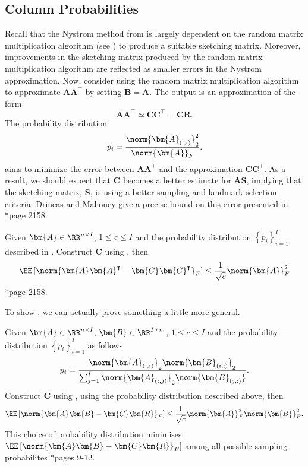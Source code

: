 \subsection{Column Probabilities}\label{Section2.2}

Recall that the Nystrom method from  is largely dependent on the random matrix multiplication algorithm (see ) to produce a suitable sketching matrix. Moreover, improvements in the sketching matrix produced by the random matrix multiplication algorithm are reflected as smaller errors in the Nystrom approximation. Now, consider using the random matrix multiplication algorithm to approximate $\bm{A} \bm{A}^{\intercal}$ by setting $\bm{B} = \bm{A}$. The output is an approximation of the form
\begin{equation*}
    \bm{A} \bm{A}^{\intercal} \simeq \bm{C} \bm{C}^{\intercal} = \bm{C} \bm{R}.
\end{equation*}
The probability distribution
\begin{equation*} \label{eq: col-probs}
    p_i = \frac{\norm{\bm{A}_{(:,i)}}_2^2}{\norm{\bm{A}}_F}.
\end{equation*}
aims to minimize the error between $\bm{A} \bm{A}^{\intercal}$ and the approximation $\bm{C} \bm{C}^{\intercal}$. As a result, we should expect that $\bm{C}$ becomes a better estimate for $\bm{A} \bm{S}$, implying that the sketching matrix, $\bm{S}$, is using a better sampling and landmark selection criteria. Drineas and Mahoney give a precise bound on this error presented in  \cite{JMLR:v6:drineas05a}*{page 2158}.

\begin{thm} \label{thm: col-pro-bounds}
    Given $\bm{A} \in \RR^{n \times I}$, $1 \leq c \leq I$ and the probability distribution $\left\{ p_i \right\}_{i=1}^{I}$ described in . Construct $\bm{C}$ using , then
    \[
        \EE \left[ \norm{\bm{A} \bm{A}^{\intercal} - \bm{C} \bm{C}^{\intercal}}_{F} \right] \leq \frac{1}{\sqrt{c}} \norm{\bm{A}}^2_{F}
    \]
    \cite{JMLR:v6:drineas05a}*{page 2158}.
\end{thm}

To show , we can actually prove something a little more general.

\begin{lem} \label{lem: col-pro-bounds-gen}
    Given $\bm{A} \in \RR^{n \times I}$, $\bm{B} \in \RR^{I \times m}$, $1 \leq c \leq I$ and the probability distribution $\left\{ p_i \right\}_{i=1}^{I}$ as follows
    \[
        p_i = \frac{\norm{\bm{A}_{(:,i)}}_2 \norm{\bm{B}_{(i,:)}}_2}{\sum_{j=1}^{I} \norm{\bm{A}_{(:,j)}}_2 \norm{\bm{B}_{(j,:)}}}.
    \]
    Construct $\bm{C}$ using , using the probability distribution described above, then
    \[
        \EE \left[ \norm{\bm{A} \bm{B} - \bm{C} \bm{R}}_{F} \right] \leq \frac{1}{\sqrt{c}} \norm{\bm{A}}^2_{F} \norm{\bm{B}}^2_{F}.
    \]
    This choice of probability distribution minimises $\EE \left[ \norm{\bm{A} \bm{B} - \bm{C} \bm{R}}_{F} \right]$ among all possible sampling probabilites \cite{doi:10.1137/S0097539704442684}*{pages 9-12}.
\end{lem}

